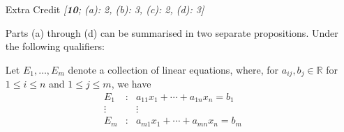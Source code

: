 \documentclass{amsart}
\theoremstyle{definition}
\theoremstyle{definition}
\DeclareMathOperator{\R}{\mathbb{R}}
\DeclareMathOperator{\1}{\mathbbm{1}}
\renewcommand{\phi}{\varphi}
\begin{document}
\begin{enumerate}[itemsep = 2mm]
\begin{enumerate}
\begin{proof}
			To show this is indeed a linear map, let $x \coloneqq (a_1,a_2)$ and $y \coloneqq (b_1,b_2)$, and $c,d \in \R$. Then, noting that
			\begin{align*}
			cx + dy = c(a_1,a_2) + d(b_1,b_2) = (c a_1 + d b_1, c a_2 + d b_2)
			\end{align*}
			we then have
			\begin{align*}
			T_\phi (cx + dy) &= ( (c a_1 + d b_1) \cos \phi - (c a_2 + d b_2) \sin \phi, (c a_1 + d b_1) \sin \phi + (c a_2 + d b_2) \cos \phi ) \\
			&= ( c(a_1 \cos \phi - a_2 \sin \phi) + d(b_1 \cos \phi - b_2 \sin \phi), d(b_1 \cos \phi + b_2 \sin \phi) + c (a_1 \sin \phi + a_2 \cos \phi) ) \\
			&= c(a_1 \cos \phi - a_2 \sin \phi, a_1 \sin \phi + a_2 \cos \phi) + d(b_1 \cos \phi - b_2 \sin \phi, b_1 \sin \phi + b_2 \cos \phi) \\
			&= c T_\phi(x) + d T_\phi (y)
			\end{align*}
			as desired.
		\end{proof}
		
		\item \textbf{False}. Let $T$ and $S$ be linear transformations; they are both closed under addition and scalar multiplication. Check the properties to see that the result is always a linear transformation, ie. $T \circ S$ (or $S \circ T$) are both linear transformations.
		
		\item \textbf{False}. The statement here is exactly the other way around.
		
		\item \textbf{False}. If the matrix has two pivots, then it is injective (one-to-one) but not surjective (onto).
	\end{enumerate}
	
	
	\item[Extra Credit] \textit{[\textbf{10}; (a): 2, (b): 3, (c): 2, (d): 3]}
	
	
	Parts (a) through (d) can be summarised in two separate propositions. Under the following qualifiers:
	
	Let $E_1,\ldots, E_m$ denote a collection of linear equations, where, for $a_{ij}, b_j\in \mathbb{R}$ for $1\le i\le n$ and $1\le j\le m$, we have
	\begin{equation*}
	\begin{matrix}
	E_1 &:& a_{11}x_1+\cdots+ a_{1n}x_n=b_1\\
	\vdots& & \vdots \\
	E_m &:& a_{m1}x_1+\cdots+ a_{mn} x_n=b_m
	\end{matrix}
	\end{equation*}
	

\end{enumerate}
\end{document}
